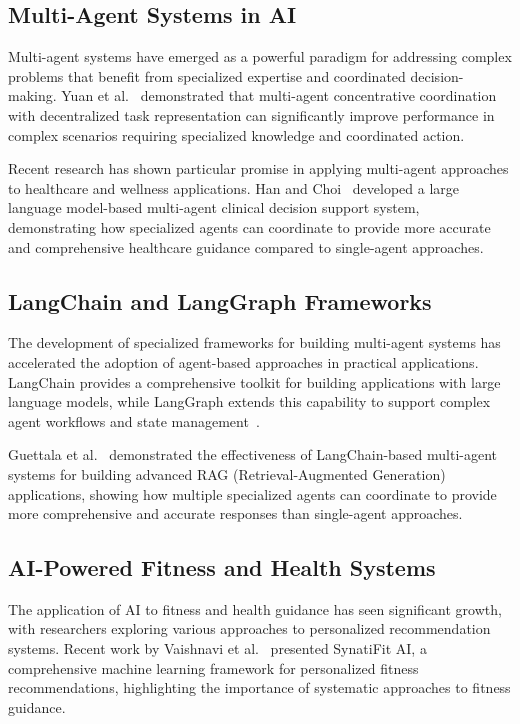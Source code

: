 \documentclass[conference]{IEEEtran}
\begin{document}
\subsection{Multi-Agent Systems in AI}

Multi-agent systems have emerged as a powerful paradigm for addressing complex problems that benefit from specialized expertise and coordinated decision-making. Yuan et al.~\cite{macc2022} demonstrated that multi-agent concentrative coordination with decentralized task representation can significantly improve performance in complex scenarios requiring specialized knowledge and coordinated action.

Recent research has shown particular promise in applying multi-agent approaches to healthcare and wellness applications. Han and Choi~\cite{ktas2024} developed a large language model-based multi-agent clinical decision support system, demonstrating how specialized agents can coordinate to provide more accurate and comprehensive healthcare guidance compared to single-agent approaches.

\subsection{LangChain and LangGraph Frameworks}

The development of specialized frameworks for building multi-agent systems has accelerated the adoption of agent-based approaches in practical applications. LangChain provides a comprehensive toolkit for building applications with large language models, while LangGraph extends this capability to support complex agent workflows and state management~\cite{langgraph2024}.

Guettala et al.~\cite{langchainrag2024} demonstrated the effectiveness of LangChain-based multi-agent systems for building advanced RAG (Retrieval-Augmented Generation) applications, showing how multiple specialized agents can coordinate to provide more comprehensive and accurate responses than single-agent approaches.

\subsection{AI-Powered Fitness and Health Systems}

The application of AI to fitness and health guidance has seen significant growth, with researchers exploring various approaches to personalized recommendation systems. Recent work by Vaishnavi et al.~\cite{synatiafit2025} presented SynatiFit AI, a comprehensive machine learning framework for personalized fitness recommendations, highlighting the importance of systematic approaches to fitness guidance.
\end{document}
